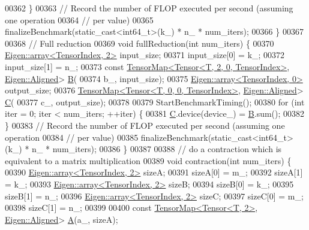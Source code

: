 \begin{DoxyCode}
00362     \}
00363     \textcolor{comment}{// Record the number of FLOP executed per second (assuming one operation}
00364     \textcolor{comment}{// per value)}
00365     finalizeBenchmark(static\_cast<int64\_t>(k\_) * n\_ * num\_iters);
00366   \}
00367 
00368   \textcolor{comment}{// Full reduction}
00369   \textcolor{keywordtype}{void} fullReduction(\textcolor{keywordtype}{int} num\_iters) \{
00370     \hyperlink{class_eigen_1_1array}{Eigen::array<TensorIndex, 2>} input\_size;
00371     input\_size[0] = k\_;
00372     input\_size[1] = n\_;
00373     \textcolor{keyword}{const} \hyperlink{class_eigen_1_1_tensor_map}{TensorMap<Tensor<T, 2, 0, TensorIndex>}, 
      \hyperlink{group__enums_gga45fe06e29902b7a2773de05ba27b47a1ad37d4c71425bb286e9b4103830538fbf}{Eigen::Aligned}> \hyperlink{group___core___module_class_eigen_1_1_matrix}{B}(
00374         b\_, input\_size);
00375     \hyperlink{class_eigen_1_1array}{Eigen::array<TensorIndex, 0>} output\_size;
00376     \hyperlink{class_eigen_1_1_tensor_map}{TensorMap<Tensor<T, 0, 0, TensorIndex>}, 
      \hyperlink{group__enums_gga45fe06e29902b7a2773de05ba27b47a1ad37d4c71425bb286e9b4103830538fbf}{Eigen::Aligned}> \hyperlink{group___core___module}{C}(
00377         c\_, output\_size);
00378 
00379     StartBenchmarkTiming();
00380     \textcolor{keywordflow}{for} (\textcolor{keywordtype}{int} iter = 0; iter < num\_iters; ++iter) \{
00381       \hyperlink{group___core___module}{C}.device(device\_) = \hyperlink{group___core___module_class_eigen_1_1_matrix}{B}.sum();
00382     \}
00383     \textcolor{comment}{// Record the number of FLOP executed per second (assuming one operation}
00384     \textcolor{comment}{// per value)}
00385     finalizeBenchmark(static\_cast<int64\_t>(k\_) * n\_ * num\_iters);
00386   \}
00387 
00388   \textcolor{comment}{// do a contraction which is equivalent to a matrix multiplication}
00389   \textcolor{keywordtype}{void} contraction(\textcolor{keywordtype}{int} num\_iters) \{
00390     \hyperlink{class_eigen_1_1array}{Eigen::array<TensorIndex, 2>} sizeA;
00391     sizeA[0] = m\_;
00392     sizeA[1] = k\_;
00393     \hyperlink{class_eigen_1_1array}{Eigen::array<TensorIndex, 2>} sizeB;
00394     sizeB[0] = k\_;
00395     sizeB[1] = n\_;
00396     \hyperlink{class_eigen_1_1array}{Eigen::array<TensorIndex, 2>} sizeC;
00397     sizeC[0] = m\_;
00398     sizeC[1] = n\_;
00399 
00400     \textcolor{keyword}{const} \hyperlink{class_eigen_1_1_tensor_map}{TensorMap<Tensor<T, 2>}, \hyperlink{group__enums_gga45fe06e29902b7a2773de05ba27b47a1ad37d4c71425bb286e9b4103830538fbf}{Eigen::Aligned}> 
      \hyperlink{group___core___module_class_eigen_1_1_matrix}{A}(a\_, sizeA);

\end{DoxyCode}
